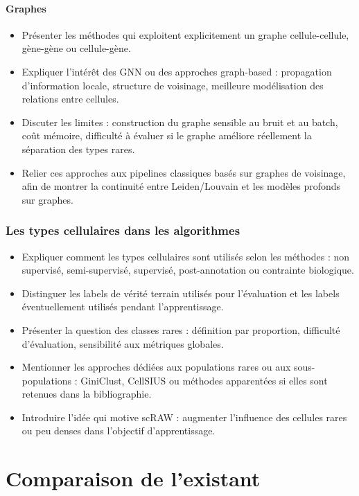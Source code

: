 \paragraph{Graphes}
\begin{itemize}
  \item Présenter les méthodes qui exploitent explicitement un graphe cellule-cellule, gène-gène ou cellule-gène.
  \item Expliquer l'intérêt des GNN ou des approches graph-based : propagation d'information locale, structure de voisinage, meilleure modélisation des relations entre cellules.
  \item Discuter les limites : construction du graphe sensible au bruit et au batch, coût mémoire, difficulté à évaluer si le graphe améliore réellement la séparation des types rares.
  \item Relier ces approches aux pipelines classiques basés sur graphes de voisinage, afin de montrer la continuité entre Leiden/Louvain et les modèles profonds sur graphes.
\end{itemize}

\subsubsection{Les types cellulaires dans les algorithmes}
\begin{itemize}
  \item Expliquer comment les types cellulaires sont utilisés selon les méthodes : non supervisé, semi-supervisé, supervisé, post-annotation ou contrainte biologique.
  \item Distinguer les labels de vérité terrain utilisés pour l'évaluation et les labels éventuellement utilisés pendant l'apprentissage.
  \item Présenter la question des classes rares : définition par proportion, difficulté d'évaluation, sensibilité aux métriques globales.
  \item Mentionner les approches dédiées aux populations rares ou aux sous-populations : GiniClust, CellSIUS ou méthodes apparentées si elles sont retenues dans la bibliographie.
  \item Introduire l'idée qui motive scRAW : augmenter l'influence des cellules rares ou peu denses dans l'objectif d'apprentissage.
\end{itemize}


\section{Comparaison de l'existant}

